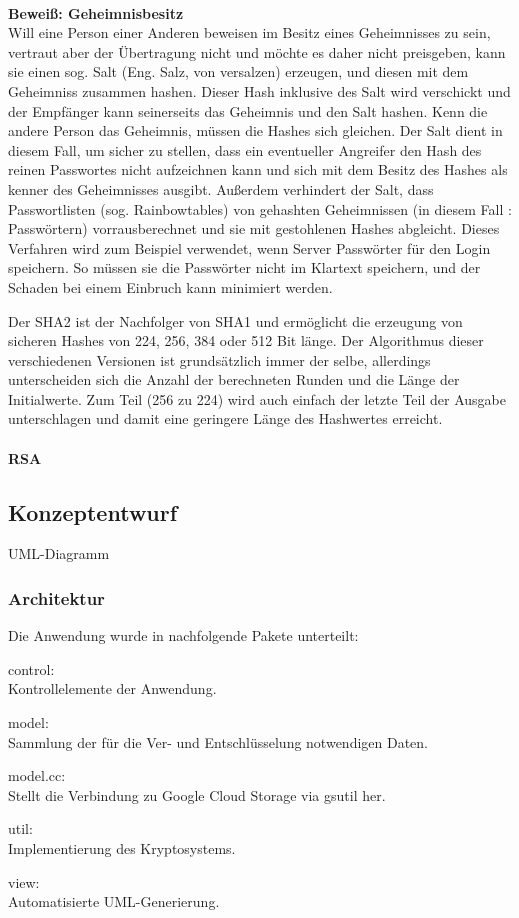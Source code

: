 \documentclass[12pt,a4paper,bibliography=totocnumbered,listof=totocnumbered]{scrartcl}
\begin{document}
\\\textbf{Beweiß: Geheimnisbesitz}\\
Will eine Person einer Anderen beweisen im Besitz eines Geheimnisses zu sein, vertraut aber der Übertragung nicht und möchte es daher nicht preisgeben, kann sie einen sog. Salt (Eng. Salz, von versalzen) erzeugen, und diesen mit dem Geheimniss zusammen hashen. Dieser Hash inklusive des Salt wird verschickt und der Empfänger kann seinerseits das Geheimnis und den Salt hashen. Kenn die andere Person das Geheimnis, müssen die Hashes sich gleichen. Der Salt dient in diesem Fall, um sicher zu stellen, dass ein eventueller Angreifer den Hash des reinen Passwortes nicht aufzeichnen kann und sich mit dem Besitz des Hashes als kenner des Geheimnisses ausgibt. Außerdem verhindert der Salt, dass Passwortlisten (sog. Rainbowtables) von gehashten Geheimnissen (in diesem Fall : Passwörtern) vorrausberechnet und sie mit gestohlenen Hashes abgleicht. Dieses Verfahren wird zum Beispiel verwendet, wenn Server Passwörter für den Login speichern. So müssen sie die Passwörter nicht im Klartext speichern, und der Schaden bei einem Einbruch kann minimiert werden. 

Der SHA2 ist der Nachfolger von SHA1 und ermöglicht die erzeugung von sicheren Hashes von 224, 256, 384 oder 512 Bit länge. Der Algorithmus dieser verschiedenen Versionen ist grundsätzlich immer der selbe, allerdings unterscheiden sich die Anzahl der berechneten Runden und die Länge der Initialwerte. Zum Teil (256 zu 224) wird auch einfach der letzte Teil der Ausgabe unterschlagen und damit eine geringere Länge des Hashwertes erreicht.
\\\cite{8}\cite{9}\cite{10}\\

\textbf{RSA}\\
\subsection{Konzeptentwurf}
UML-Diagramm
\subsubsection{Architektur}
Die Anwendung wurde in nachfolgende Pakete unterteilt:
\begin{compactitem}
	\item control:\\
Kontrollelemente der Anwendung.
	\item model:\\
Sammlung der für die Ver- und Entschlüsselung notwendigen Daten.
	\item model.cc:\\
Stellt die Verbindung zu Google Cloud Storage via gsutil her.
	\item util:\\
Implementierung des Kryptosystems.
	\item view:\\
Automatisierte UML-Generierung.
\end{compactitem}
\end{document}
